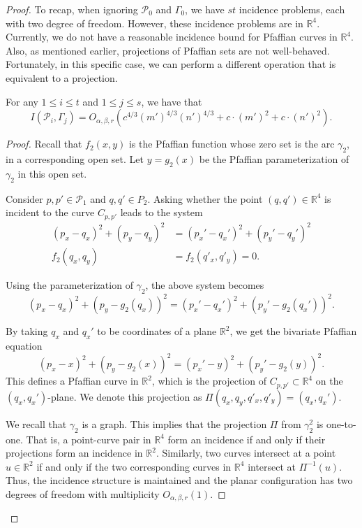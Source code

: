 \documentclass[11pt]{article}
\theoremstyle{definition}
\newcommand{\RR}{\mathbb R}
\newcommand{\pts}{\mathcal{P}}
\newcommand{\curves}{\Gamma}
\begin{document}
\begin{proof}
To recap, when ignoring $\pts_0$ and $\curves_0$, we have $st$ incidence problems, each with two degree of freedom. 
However, these incidence problems are in $\RR^4$. 
Currently, we do not have a reasonable incidence bound for Pfaffian curves in $\RR^4$.
Also, as mentioned earlier, projections of Pfaffian sets are not well-behaved.
Fortunately, in this specific case, we can perform a different operation that is equivalent to a projection. 

\begin{lemma}\label{le:mainincidences}
For any $1\le i \le t$ and $1\le j\le s$, we have that
%
\[ I(\pts_i,\curves_j) = O_{\alpha,\beta,r}\left(c^{4/3}(m')^{4/3}(n')^{4/3} + c\cdot(m')^2 + c\cdot (n')^2\right).\]
%
\end{lemma}
\begin{proof}
Recall that $f_2(x,y)$ is the Pfaffian function whose zero set is the arc $\gamma_2$, in a corresponding open set. 
Let $y=g_2(x)$ be the Pfaffian parameterization of $\gamma_2$ in this open set. 

Consider $p,p'\in \pts_1$ and $q,q'\in P_2$. 
Asking whether the point $(q,q')\in \RR^4$ is incident to the curve $C_{p,p'}$ leads to the system 
\begin{align*}
(p_x-q_x )^2+(p_y-q_y )^2 &= (p_x'-q_x')^2+(p_y'-q_y')^2 \\[2mm]
f_2(q_x,q_y)&=f_2(q'_x,q'_y)=0.
\end{align*}

Using the parameterization of $\gamma_2$, the above system becomes
%
\[ (p_x-q_x)^2+(p_y-g_2(q_x ))^2=(p_x'-q_x' )^2+(p_y'-g_2(q_x'))^2. \]

By taking $q_x$ and $q_x'$ to be coordinates of a plane $\RR^2$, we get the bivariate Pfaffian equation
%
\[ (p_x-x)^2+(p_y-g_2(x))^2=(p_x'-y)^2+(p_y'-g_2(y))^2. \]
%
This defines a Pfaffian curve in $\RR^2$, which is the projection of $C_{p,p'}\subset\RR^4$ on the $(q_x,q_x')$-plane. 
We denote this projection as $\Pi(q_x,q_y,q'_x,q'_y) = (q_x,q_x')$.

We recall that $\gamma_2$ is a graph.
This implies that the projection $\Pi$ from $\gamma_2^2$ is one-to-one. 
That is, a point-curve pair in $\RR^4$ form an incidence if and only if their projections form an incidence in $\RR^2$.
Similarly, two curves intersect at a point $u\in \RR^2$ if and only if the two corresponding curves in $\RR^4$ intersect at $\Pi^{-1}(u)$.  
Thus, the incidence structure is maintained and the planar configuration has two degrees of freedom with multiplicity $O_{\alpha,\beta,r}(1)$. 
 

\end{proof}
\end{proof}
\end{document}
